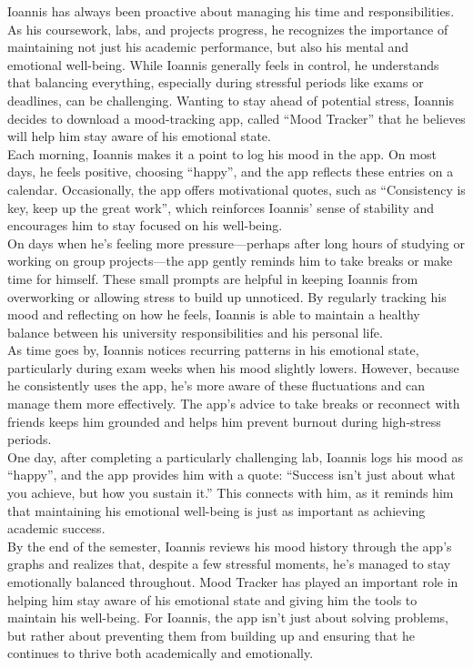 Ioannis has always been proactive about managing his time and responsibilities. As his coursework, labs, and projects progress, he recognizes the importance of maintaining not just his academic performance, but also his mental and emotional well-being. While Ioannis generally feels in control, he understands that balancing everything, especially during stressful periods like exams or deadlines, can be challenging. Wanting to stay ahead of potential stress, Ioannis decides to download a mood-tracking app, called ``Mood Tracker'' that he believes will help him stay aware of his emotional state.\vspace{5mm} \\
Each morning, Ioannis makes it a point to log his mood in the app. On most days, he feels positive, choosing “happy”, and the app reflects these entries on a calendar. Occasionally, the app offers motivational quotes, such as “Consistency is key, keep up the great work”, which reinforces Ioannis' sense of stability and encourages him to stay focused on his well-being.\vspace{5mm} \\
On days when he’s feeling more pressure—perhaps after long hours of studying or working on group projects—the app gently reminds him to take breaks or make time for himself. These small prompts are helpful in keeping Ioannis from overworking or allowing stress to build up unnoticed. By regularly tracking his mood and reflecting on how he feels, Ioannis is able to maintain a healthy balance between his university responsibilities and his personal life.\vspace{5mm} \\
As time goes by, Ioannis notices recurring patterns in his emotional state, particularly during exam weeks when his mood slightly lowers. However, because he consistently uses the app, he's more aware of these fluctuations and can manage them more effectively. The app’s advice to take breaks or reconnect with friends keeps him grounded and helps him prevent burnout during high-stress periods.\vspace{5mm} \\
One day, after completing a particularly challenging lab, Ioannis logs his mood as ``happy'', and the app provides him with a quote: “Success isn’t just about what you achieve, but how you sustain it.” This connects with him, as it reminds him that maintaining his emotional well-being is just as important as achieving academic success.\vspace{5mm} \\
By the end of the semester, Ioannis reviews his mood history through the app’s graphs and realizes that, despite a few stressful moments, he’s managed to stay emotionally balanced throughout. Mood Tracker has played an important role in helping him stay aware of his emotional state and giving him the tools to maintain his well-being. For Ioannis, the app isn't just about solving problems, but rather about preventing them from building up and ensuring that he continues to thrive both academically and emotionally.

